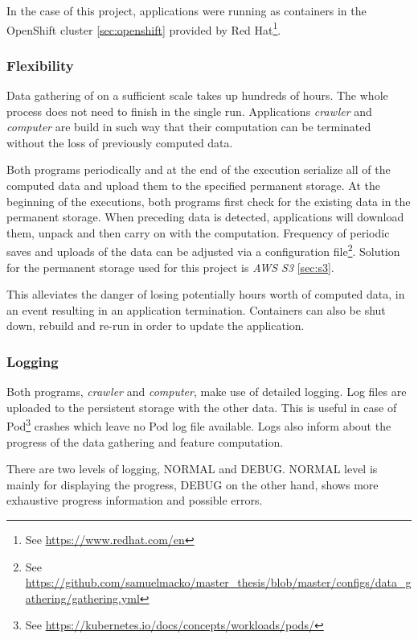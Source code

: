 In the case of this project, applications were running as containers in the OpenShift cluster \ref{sec:openshift} provided by Red Hat\footnote{See \url{https://www.redhat.com/en}}.

\subsubsection{Flexibility}

Data gathering of on a sufficient scale takes up hundreds of hours.
The whole process does not need to finish in the single run.
Applications \emph{crawler} and \emph{computer} are build in such way that their computation can be terminated without the loss of previously computed data.

Both programs periodically and at the end of the execution serialize all of the computed data and upload them to the specified permanent storage.
At the beginning of the executions, both programs first check for the existing data in the permanent storage.
When preceding data is detected, applications will download them, unpack and then carry on with the computation.
Frequency of periodic saves and uploads of the data can be adjusted via a configuration file\footnote{See \url{https://github.com/samuelmacko/master\_thesis/blob/master/configs/data_gathering/gathering.yml}}.
Solution for the permanent storage used for this project is \emph{AWS S3} \ref{sec:s3}.

This alleviates the danger of losing potentially hours worth of computed data, in an event resulting in an application termination.
Containers can also be shut down, rebuild and re-run in order to update the application.

\subsubsection{Logging}

Both programs, \emph{crawler} and \emph{computer}, make use of detailed logging.
Log files are uploaded to the persistent storage with the other data.
This is useful in case of Pod\footnote{See \url{https://kubernetes.io/docs/concepts/workloads/pods/}} crashes which leave no Pod log file available.
Logs also inform about the progress of the data gathering and feature computation.

There are two levels of logging, NORMAL and DEBUG.
NORMAL level is mainly for displaying the progress, DEBUG on the other hand, shows more exhaustive progress information and possible errors.

